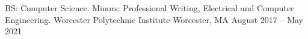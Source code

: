 

\begin{cventries}

  \cventry
    {BS: Computer Science. Minors: Professional Writing, Electrical and Computer Engineering.} %
    {Worcester Polytechnic Institute} %
    {Worcester, MA} %
    {August 2017 – May 2021} %
    {
    }
\end{cventries}

